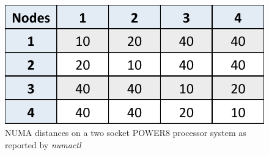 \begin{figure}[h]
  \centering
  \includegraphics[height=0.25\textwidth]{./Images/crest.pdf}
       \caption{NUMA distances on a two socket POWER8 processor system as reported by \textit{numactl}}
       \label{fig:crest}
\end{figure}


